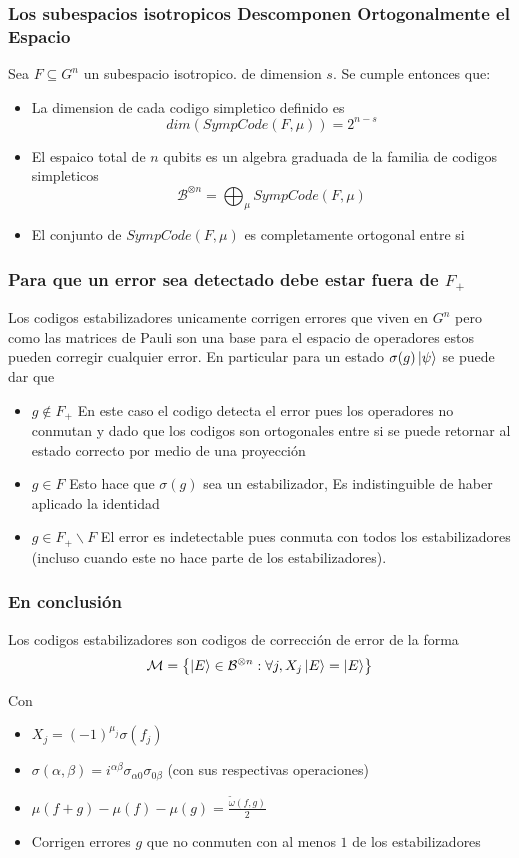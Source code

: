 \documentclass[english,9pt]{Linnaeus}
\begin{document}
\begin{frame}
  \frametitle{Los subespacios isotropicos Descomponen Ortogonalmente el Espacio}
  Sea $F \subseteq G^n$ un subespacio isotropico. de dimension $s$. Se cumple entonces que:
  \begin{itemize}
    \item La dimension de cada codigo simpletico definido es
      $$dim(SympCode(F, \mu)) = 2^{n - s}$$
    \item El espaico total de $n$ qubits es un algebra graduada de la familia de codigos simpleticos
      $$\mathcal{B}^{\otimes n} = \bigoplus_{\mu} SympCode(F, \mu)$$
    \item El conjunto de $SympCode(F, \mu)$ es completamente ortogonal entre si
  \end{itemize}
\end{frame}

\begin{frame}
  \frametitle{Para que un error sea detectado debe estar fuera de $F_+$}

  Los codigos estabilizadores unicamente corrigen errores que viven en $G^n$ pero como las matrices de Pauli son una base para el espacio de operadores estos pueden corregir cualquier error. En particular para un estado $\sigma(g) \ket{\psi}$ se puede dar que
  \begin{itemize}
    \item $g \not\in F_+$ En este caso el codigo detecta el error pues los operadores no conmutan y dado que los codigos son ortogonales entre si se puede retornar al estado correcto por medio de una proyección
    \item $g \in F$ Esto hace que $\sigma(g)$ sea un estabilizador, Es indistinguible de haber aplicado la identidad
    \item $g \in F_+ \backslash F$ El error es indetectable pues conmuta con todos los estabilizadores (incluso cuando este no hace parte de los estabilizadores).
  \end{itemize}
\end{frame}

\begin{frame}
  \frametitle{En conclusión}
  Los codigos estabilizadores son codigos de corrección de error de la forma
  \[
    \mathcal{M} = \left\{ \ket{E} \in \mathcal{B}^{\otimes n} : \forall j, X_j \ket{E} = \ket{E}\right\}
  \]

  Con 
  \begin{itemize}
    \item $X_j = (-1)^{\mu_j} \sigma(f_j)$
    \item $\sigma(\alpha, \beta) = i^{\alpha\beta} \sigma_{\alpha 0}\sigma_{0 \beta}$ (con sus respectivas operaciones)
    \item $\mu(f + g) - \mu(f) - \mu(g) = \frac{\tilde{\omega}(f, g)}{2}$
    \item Corrigen errores $g$ que no conmuten con al menos $1$ de los estabilizadores
  \end{itemize}

\end{frame}
\end{document}
